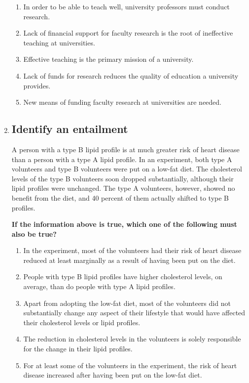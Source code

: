 \documentclass[9pt]{article}
\begin{document}
\begin{multicols}{3}
\begin{enumerate}
\begin{enumerate}[label=(\alph*)]
    \item In order to be able to teach well, university professors must conduct research.
    \item Lack of financial support for faculty research is the root of ineffective teaching at universities.
    \item Effective teaching is the primary mission of a university.
    \item Lack of funds for research reduces the quality of education a university provides.
    \item New means of funding faculty research at universities are needed.
\end{enumerate}

\item

\subsection*{Identify an entailment}
\noindent
A person with a type B lipid profile is at much greater risk of heart disease than a person with a type A lipid profile. In an experiment, both type A volunteers and type B volunteers were put on a low-fat diet. The cholesterol levels of the type B volunteers soon dropped substantially, although their lipid profiles were unchanged. The type A volunteers, however, showed no benefit from the diet, and 40 percent of them actually shifted to type B profiles.

 

\noindent
\textbf{If the information above is true, which one of the following must also be true?}

\begin{enumerate}[label=(\alph*)]
    \item In the experiment, most of the volunteers had their risk of heart disease reduced at least marginally as a result of having been put on the diet.
    \item People with type B lipid profiles have higher cholesterol levels, on average, than do people with type A lipid profiles.
    \item Apart from adopting the low-fat diet, most of the volunteers did not substantially change any aspect of their lifestyle that would have affected their cholesterol levels or lipid profiles.
    \item The reduction in cholesterol levels in the volunteers is solely responsible for the change in their lipid profiles.
    \item For at least some of the volunteers in the experiment, the risk of heart disease increased after having been put on the low-fat diet.
\end{enumerate}


\end{enumerate}
\end{multicols}
\end{document}
